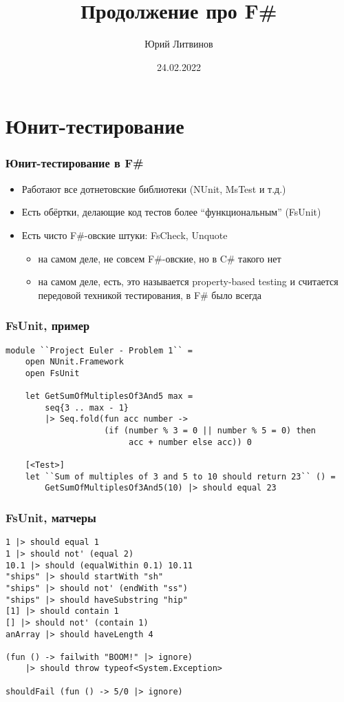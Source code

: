 \documentclass[xetex,mathserif,serif]{beamer}
\title{Продолжение про F\#}
\author{Юрий Литвинов}
\date{24.02.2022}
\begin{document}
    
    \frame{\titlepage}

    \section{Юнит-тестирование}

    \begin{frame}
        \frametitle{Юнит-тестирование в F\#}
        \begin{itemize}
            \item Работают все дотнетовские библиотеки (NUnit, MsTest и т.д.)
            \item Есть обёртки, делающие код тестов более ``функциональным'' (FsUnit)
            \item Есть чисто F\#-овские штуки: FsCheck, Unquote 
            \begin{itemize}
                \item на самом деле, не совсем F\#-овские, но в C\# такого нет
                \item на самом деле, есть, это называется property-based testing и считается передовой техникой тестирования, в F\# было всегда
            \end{itemize}
        \end{itemize}
    \end{frame}

    \begin{frame}[fragile]
        \frametitle{FsUnit, пример}
        \begin{verbatim}
module ``Project Euler - Problem 1`` =
    open NUnit.Framework
    open FsUnit

    let GetSumOfMultiplesOf3And5 max =
        seq{3 .. max - 1} 
        |> Seq.fold(fun acc number ->
                    (if (number % 3 = 0 || number % 5 = 0) then
                         acc + number else acc)) 0

    [<Test>]
    let ``Sum of multiples of 3 and 5 to 10 should return 23`` () =
        GetSumOfMultiplesOf3And5(10) |> should equal 23
        \end{verbatim}
    \end{frame}

    \begin{frame}[fragile]
        \frametitle{FsUnit, матчеры}
        \begin{verbatim}
1 |> should equal 1
1 |> should not' (equal 2)
10.1 |> should (equalWithin 0.1) 10.11
"ships" |> should startWith "sh"
"ships" |> should not' (endWith "ss")
"ships" |> should haveSubstring "hip"
[1] |> should contain 1
[] |> should not' (contain 1)
anArray |> should haveLength 4

(fun () -> failwith "BOOM!" |> ignore) 
    |> should throw typeof<System.Exception>

shouldFail (fun () -> 5/0 |> ignore)
        \end{verbatim}
    \end{frame}
\end{document}
